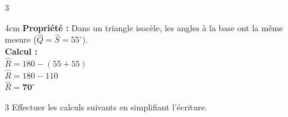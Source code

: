 \documentclass[a4paper]{book}
\begin{document}
{\begin{exerciceNote}{3}
\begin{minipage}{0.32\linewidth}
\begin{center}
            \end{center}
            
            \begin{ZoneReponse}{4cm}
                 \textbf{Propriété :} Dans un triangle isocèle, les angles à la base ont la même mesure ($\widehat{Q} = \widehat{S} = 55^\circ$). \\
                 \textbf{Calcul :} \\
                 $\widehat{R} = 180 - (55 + 55)$ \\
                 $\widehat{R} = 180 - 110$ \\
                 $\widehat{R} = \mathbf{70^\circ}$
            \end{ZoneReponse}
        \end{minipage}
    \end{exerciceNote}
      

    \begin{exerciceNote}{3}  
        Effectuer les calculs suivants en simplifiant l'écriture.

        \medskip
        

\end{exerciceNote}}
\end{document}
